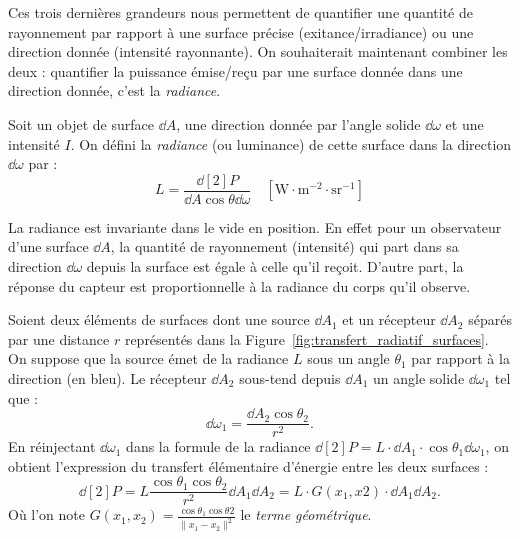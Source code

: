 Ces trois dernières grandeurs nous permettent de quantifier une quantité de rayonnement par rapport à une surface précise (exitance/irradiance) ou une direction donnée (intensité rayonnante). On souhaiterait maintenant combiner les deux : quantifier la puissance émise/reçu par une surface donnée dans une direction donnée, c'est la \emph{radiance}. 

\begin{definition}
    Soit un objet de surface $ \dd A$, une direction donnée par l'angle solide $ \dd \omega$ et une intensité $I$. On défini la \emph{radiance} (ou luminance) de cette surface dans la direction $\dd \omega$ par : 
    \begin{equation}
        L = \frac{\dd[2]{P}}{\dd A \cos \theta \dd \omega} \quad [\mathrm{W} \cdot \mathrm{m}^{-2} \cdot \mathrm{sr}^{-1}]
    \end{equation}
\end{definition}

\begin{remark}
    La radiance est invariante dans le vide en position. En effet pour un observateur d'une surface $ \dd A$, la quantité de rayonnement (intensité) qui part dans sa direction $ \dd \omega$ depuis la surface est égale à celle qu'il reçoit. 
    D'autre part, la réponse du capteur est proportionnelle à la radiance du corps qu'il observe. 
\end{remark}

\begin{proposition}
    Soient deux éléments de surfaces dont une source $ \dd A_1$ et un récepteur $ \dd A_2$ séparés par une distance $r$ représentés dans la Figure~\ref{fig:transfert_radiatif_surfaces}. On suppose que la source émet de la radiance $L$ sous un angle $ \theta_1$ par rapport à la direction (en bleu). Le récepteur $ \dd A_2$ sous-tend depuis $ \dd A_1$ un angle solide $\dd \omega_1$ tel que : 
    \begin{equation}
        \dd \omega_1 = \frac{\dd A_2 \cos \theta_2}{r^2}. 
    \end{equation}
    En réinjectant $ \dd \omega_1$ dans la formule de la radiance $ \dd[2]{P} = L \cdot \dd A_1 \cdot \cos \theta_1 \dd \omega_1$, on obtient l'expression du transfert élémentaire d'énergie entre les deux surfaces : 
    \begin{equation}
        \dd[2]{P} = L \frac{\cos \theta_1 \cos \theta_2}{r^2} \dd A_1 \dd A_2
        = L \cdot G(x_1, x2) \cdot \dd A_1 \dd A_2. 
    \end{equation}
    Où l'on note $G(x_1, x_2) = \frac{ \cos \theta_1 \cos \theta2}{\|x_1 - x_2 \|^2}$ le \emph{terme géométrique}. 
\end{proposition}

